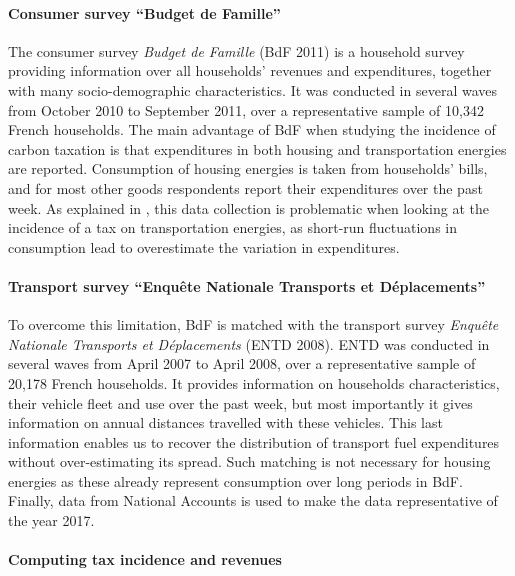 \documentclass[12pt]{article} %
\begin{document}
\paragraph{Consumer survey ``Budget de Famille''}

The consumer survey \emph{Budget de Famille} (BdF 2011) is a household survey providing information over all households' revenues and expenditures, together with many socio-demographic characteristics. It was conducted in several waves from October 2010 to September 2011, over a representative sample of 10,342 French households. The main advantage of BdF when studying the incidence of carbon taxation is that expenditures in both housing and transportation energies are reported. Consumption of housing energies is taken from households' bills, and for most other goods respondents report their expenditures over the past week. As explained in \citet{douenne_2020}, this data collection is problematic when looking at the incidence of a tax on transportation energies, as short-run fluctuations in consumption lead to overestimate the variation in expenditures.

\paragraph{Transport survey ``Enquête Nationale Transports et Déplacements''}
 To overcome this limitation, BdF is matched with the transport survey \emph{Enquête Nationale Transports et Déplacements} (ENTD 2008). ENTD was conducted in several waves from April 2007 to April 2008, over a representative sample of 20,178 French households. It provides information on households characteristics, their vehicle fleet and use over the past week, but most importantly it gives information on annual distances travelled with these vehicles. This last information enables us to recover the distribution of transport fuel expenditures without over-estimating its spread. Such matching is not necessary for housing energies as these already represent consumption over long periods in BdF. Finally, data from National Accounts is used to make the data representative of the year 2017. %
 
 \paragraph{Computing tax incidence and revenues}
 
\end{document}
